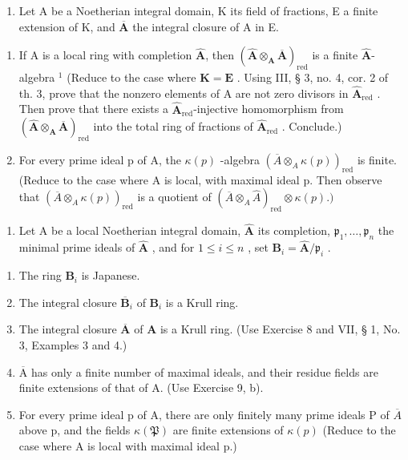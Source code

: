\begin{enumerate}
\def\labelenumi{\arabic{enumi})}
\setcounter{enumi}{8}
\tightlist
\item
  Let A be a Noetherian integral domain, K its field of fractions, E a finite extension of K, and \(\overline{\mathbf{A}}\) the integral closure of A in E.
\end{enumerate}

\begin{enumerate}
\def\labelenumi{\alph{enumi})}
\item
  If A is a local ring with completion \(\hat{\mathbf{A}}\), then \((\hat{\mathbf{A}} \otimes_{\mathbf{A}} \overline{\mathbf{A}})_{\mathrm{red}}\) is a finite \(\hat{\mathbf{A}}\)-algebra \(^{1}\) (Reduce to the case where \(\mathbf{K} = \mathbf{E}\) . Using III, § 3, no. 4, cor. 2 of th. 3, prove that the nonzero elements of A are not zero divisors in \(\hat{\mathbf{A}}_{\mathrm{red}}\) . Then prove that there exists a \(\hat{\mathbf{A}}_{\mathrm{red}}\)-injective homomorphism from \((\hat{\mathbf{A}} \otimes_{\mathbf{A}} \overline{\mathbf{A}})_{\mathrm{red}}\) into the total ring of fractions of \(\hat{\mathbf{A}}_{\mathrm{red}}\) . Conclude.)
\item
  For every prime ideal p of A, the \(\kappa(p)\) -algebra \((\overline{A} \otimes_A \kappa(p))_{\text{red}}\) is finite. (Reduce to the case where A is local, with maximal ideal p. Then observe that \((\overline{A} \otimes_A \kappa(p))_{\text{red}}\) is a quotient of \((\overline{A} \otimes_A \hat{A})_{\text{red}} \otimes \kappa(p).)\)
\end{enumerate}

\begin{enumerate}
\def\labelenumi{\arabic{enumi})}
\setcounter{enumi}{9}
\tightlist
\item
  Let A be a local Noetherian integral domain, \(\hat{\mathbf{A}}\) its completion, \(\mathfrak{p}_1, \ldots, \mathfrak{p}_n\) the minimal prime ideals of \(\hat{\mathbf{A}}\) , and for \(1 \leqslant i \leqslant n\) , set \(\mathbf{B}_i = \hat{\mathbf{A}} / \mathfrak{p}_i\) .
\end{enumerate}

\begin{enumerate}
\def\labelenumi{\alph{enumi})}
\item
  The ring \(\mathbf{B}_i\) is Japanese.
\item
  The integral closure \(\overline{\mathbf{B}}_{i}\) of \(\mathbf{B}_{i}\) is a Krull ring.
\item
  The integral closure \(\overline{\mathbf{A}}\) of \(\mathbf{A}\) is a Krull ring. (Use Exercise 8 and VII, § 1, No. 3, Examples 3 and 4.)
\item
  \(\overline{\mathrm{A}}\) has only a finite number of maximal ideals, and their residue fields are finite extensions of that of A. (Use Exercise 9, b).
\item
  For every prime ideal p of A, there are only finitely many prime ideals P of \(\overline{A}\) above p, and the fields \(\kappa(\mathfrak{P})\) are finite extensions of \(\kappa(p)\) (Reduce to the case where A is local with maximal ideal p.)
\end{enumerate}

